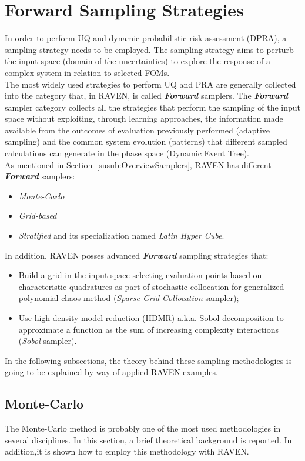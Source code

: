 \section{Forward Sampling Strategies}
\label{sec:forwardSamplingStrategies}
In order to perform UQ and dynamic
probabilistic risk assessment (DPRA),
a sampling strategy needs to be employed. The sampling strategy aims to
perturb the input space (domain of the uncertainties) to explore
the response of a complex system in relation to selected FOMs. 
\\The most widely used strategies to perform UQ and PRA are generally
collected into the category that, in RAVEN, is called \textit{\textbf{Forward}} samplers. The \textit{\textbf{Forward}} sampler category collects all the strategies that perform the sampling of the input space without exploiting, through learning approaches, the information made available from the outcomes of evaluation previously performed (adaptive sampling) and the common system evolution (patterns) that different sampled calculations can generate in the phase space (Dynamic Event Tree). 
\\As mentioned in Section~\ref{susub:OverviewSamplers}, RAVEN has
different \textit{\textbf{Forward}} samplers:
\begin{itemize}
  \item \textit{Monte-Carlo}
  \item \textit{Grid-based}
  \item \textit{Stratified} and its specialization named \textit{Latin Hyper Cube}.
\end{itemize}
In addition, RAVEN posses advanced \textit{\textbf{Forward}} sampling strategies that:
\begin{itemize}
  \item Build a grid in the input space selecting evaluation points 
  based on characteristic quadratures as part of stochastic collocation 
  for generalized polynomial chaos method (\textit{Sparse 
  Grid Collocation} sampler);
  \item Use high-density model reduction (HDMR) a.k.a. Sobol 
  decomposition to approximate a function as the sum of increasing
  complexity interactions (\textit{Sobol} sampler).
\end{itemize} 
In the following subsections, the theory behind these sampling 
methodologies is going to be explained by way of applied RAVEN 
examples.
\subsection{Monte-Carlo}
\label{sub:MC}
The Monte-Carlo method is probably one of the most used methodologies in several disciplines. In this section, a brief theoretical 
background is reported. In addition,it is shown how to employ this methodology with RAVEN.
